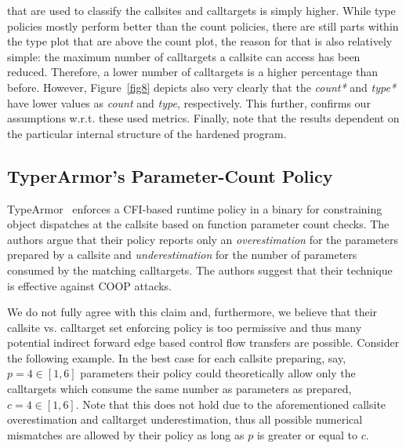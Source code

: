 that are used to classify the callsites and calltargets is simply higher. While type policies mostly 
perform better than the count policies, there are still parts within the type plot that are above the 
count plot, the reason for that is also relatively simple: the maximum number of calltargets a 
callsite can access has been reduced. Therefore, a lower number of calltargets is a higher 
percentage than before. However, Figure~\ref{fig8} depicts also very clearly
that the \textit{count*} and \textit{type*} have lower values as 
\textit{count} and \textit{type}, respectively. This further, confirms our assumptions 
w.r.t. these used metrics. Finally, note that the results dependent on the particular 
internal structure of the hardened program.


\subsection{TyperArmor's Parameter-Count Policy}
\label{RQ6:TyperArmor's Imprecise Parameter-Count Policy}
\label{Too Permissive Parameter-Based Policies}
TypeArmor~\cite{veen:typearmor} enforces a CFI-based runtime policy in a binary for constraining object dispatches at the callsite based on
function parameter count checks. The authors argue that their policy reports only an \textit{overestimation} for the parameters prepared by a 
callsite and \textit{underestimation} for the number of parameters consumed by the matching calltargets. 
The authors suggest that their technique is effective against COOP attacks. 

We do not fully agree with this claim and, furthermore, we believe that their callsite vs. calltarget set enforcing policy is too permissive and thus
many potential indirect forward edge based control flow transfers are possible. Consider the following example. In the best case for each callsite 
preparing, say, $p=4 \in [1, 6]$ parameters their policy could theoretically allow only the calltargets which consume the same number as parameters as
prepared, $c=4 \in [1, 6]$. Note that this does not hold due to 
the aforementioned callsite overestimation and calltarget underestimation, thus all possible numerical mismatches are allowed by their policy as long
as $p$ is greater or equal to $c$.

